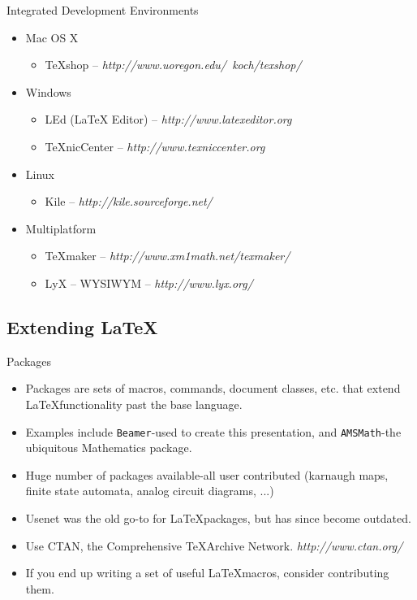 \documentclass{beamer}
\begin{document}
\begin{frame}{Integrated Development Environments}
    \begin{itemize}
        \item Mac OS X
            \begin{itemize}
                \item \TeX shop -- \emph{http://www.uoregon.edu/~koch/texshop/}
            \end{itemize}
        \item Windows
            \begin{itemize}
                \item LEd (\LaTeX { Editor}) -- \emph{http://www.latexeditor.org}
                \item \TeX nicCenter -- \emph{http://www.texniccenter.org}
            \end{itemize}
        \item Linux
            \begin{itemize}
                \item Kile -- \emph{http://kile.sourceforge.net/}
            \end{itemize}
        \item Multiplatform
            \begin{itemize}
                \item \TeX maker -- \emph{http://www.xm1math.net/texmaker/}
                \item LyX -- WYSIWYM -- \emph{http://www.lyx.org/}
            \end{itemize}
    \end{itemize}
\end{frame}

\subsection{Extending \LaTeX}

\begin{frame}{Packages}
  \begin{itemize}
    \item
      Packages are sets of macros, commands, document classes, etc. that extend
      \LaTeX functionality past the base language.
    \item
      Examples include {\tt Beamer}-used to create this presentation, and
      {\tt AMSMath}-the ubiquitous Mathematics package.
    \item
      Huge number of packages available-all user contributed (karnaugh maps, finite state automata, analog circuit diagrams, ...)
    \item
      Usenet was the old go-to for \LaTeX packages, but has since become outdated.
    \item
      Use CTAN, the Comprehensive \TeX Archive Network. {\em http://www.ctan.org/}
    \item
      If you end up writing a set of useful \LaTeX macros, consider contributing them.
  \end{itemize}
\end{frame}
\end{document}
